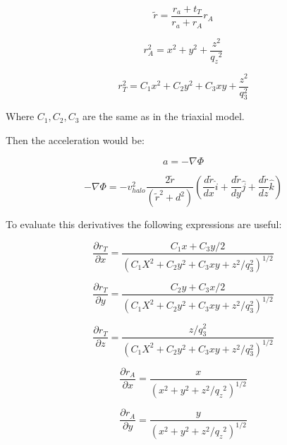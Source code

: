 \begin{equation}
\tilde{r} = \dfrac{r_a + t_T}{r_a + r_A}r_A
\end{equation}

\begin{equation}
r_A^2 = x^2 + y^2 + \dfrac{z^2}{{q_z}^2} 
\end{equation}

\begin{equation}
r_T ^ 2 = C_1 x^2 + C_2 y^2 + C_3 xy + \dfrac{z^2}{q_3^2}
\end{equation}

Where $C_1, C_2, C_3$ are the same as in the triaxial model. 

Then the acceleration would be:

\begin{equation}
a = -\nabla \Phi 
\end{equation}

\begin{equation}
-\nabla \Phi = -v_{halo}^2 \dfrac{2 \tilde{r} }{ (\tilde{r}^2 + d^2)} \left(  \dfrac{d\tilde{r}}{dx} \hat{i} + \dfrac{d\tilde{r}}{dy} \hat{j} + \dfrac{d\tilde{r}}{dz} \hat{k}    \right)
\end{equation}

To evaluate this derivatives the following expressions are useful:

\begin{equation}
\dfrac{\partial r_T}{\partial x} = \dfrac{C_1x + C_3y/2}{(C_1X^2 + C_2y^2 + C_3xy + z^2/q_3^2)^{1/2}}
\end{equation}

\begin{equation}
\dfrac{\partial r_T}{\partial y} = \dfrac{C_2y + C_3x/2}{(C_1X^2 + C_2y^2 + C_3xy + z^2/q_3^2)^{1/2}}
\end{equation}

\begin{equation}
\dfrac{\partial r_T}{\partial z} = \dfrac{z/q_3^2}{(C_1X^2 + C_2y^2 + C_3xy + z^2/q_3^2)^{1/2}}
\end{equation}

\begin{equation}
\dfrac{\partial r_A}{\partial x} = \dfrac{x}{(x^2 + y^2 + z^2/{q_z}^2)^{1/2}}
\end{equation}

\begin{equation}
\dfrac{\partial r_A}{\partial y} = \dfrac{y}{(x^2 + y^2 + z^2/{q_z}^2)^{1/2}}
\end{equation}

